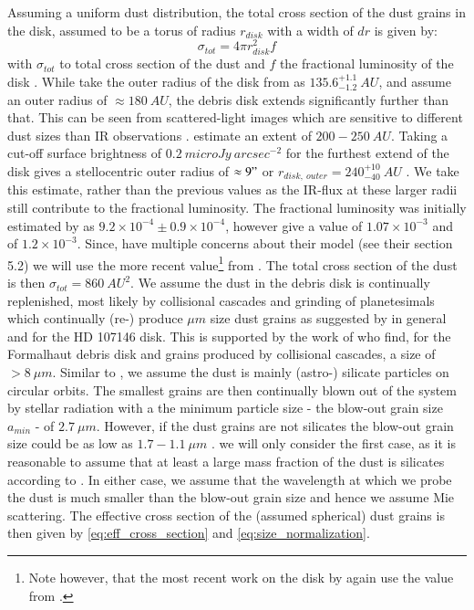 \documentclass{aa}
\begin{document}
Assuming a uniform dust distribution, the total cross section of the dust grains in the disk, assumed to be a torus of radius $r_{disk}$ with a width of $dr$ is given by:
\begin{equation}
    \sigma_{tot} = 4 \pi r_{disk}^2 f
\end{equation}
with $\sigma_{tot}$ to total cross section of the dust and $f$ the fractional luminosity of the disk \citep{wyatt2008evolution}.
While \cite{marino2018gap} take the outer radius of the disk from as $135.6^{+1.1}_{-1.2} ~ AU$, and \cite{vanSluijs2018feasibility} assume an outer radius of $\approx 180 ~ AU$, the debris disk extends significantly further than that. This can be seen from scattered-light images which are sensitive to different dust sizes than IR observations \citep{ertel2011multi}. \cite{vanSluijs2018feasibility} estimate an extent of $200-250~ AU$. Taking a cut-off surface brightness of $0.2 ~microJy~arcsec^{-2}$ for the furthest extend of the disk gives a stellocentric outer radius of $\approx 9"$ or $r_{disk,~outer} = 240^{+10}_{-40}~AU$ \citep{schneider2014probing}. We take this estimate, rather than the previous values as the IR-flux at these larger radii still contribute to the fractional luminosity. The fractional luminosity was initially estimated by \cite{moor2006nearby} as $9.2\times10^{-4} \pm 0.9\times10^{-4}$, however \cite{ertel2011multi} give a value of $1.07\times10^{-3}$ and \cite{schneider2014probing} of $1.2\times10^{-3}$. Since, \cite{ertel2011multi} have multiple concerns about their model (see their section 5.2) we will use the more recent value\footnote{Note however, that the most recent work on the disk by \cite{mesa2021limits} again use the value from \cite{ertel2011multi}.} from \cite{schneider2014probing}.
The total cross section of the dust is then $\sigma_{tot} = 860 ~ AU^2$.
We assume the dust in the debris disk is continually replenished, most likely by collisional cascades and grinding of planetesimals which continually (re-) produce $\mu m$ size dust grains as suggested by \cite{kenyon2005prospects} in general and \cite{ricci2015alma} for the HD 107146 disk. This is supported by the work of \cite{chiang2009fomalhaut} who find, for the Formalhaut debris disk and grains produced by collisional cascades, a size of $> 8~ \mu m$.
Similar to \cite{vanSluijs2018feasibility}, we assume the dust is mainly (astro-) silicate particles on circular orbits. The smallest grains are then continually blown out of the system by stellar radiation with a the minimum particle size - the blow-out grain size $a_{min}$ - of $2.7~\mu m$. However, if the dust grains are not silicates the blow-out grain size could be as low as $1.7-1.1~\mu m$ \citep{ricci2015alma, marino2018gap}. we will only consider the first case, as it is reasonable to assume that at least a large mass fraction of the dust is silicates according to \cite{marino2018gap}. In either case, we assume that the wavelength at which we probe the dust is much smaller than the blow-out grain size and hence we assume Mie scattering. The effective cross section of the (assumed spherical) dust grains is then given by \autoref{eq:eff_cross_section} and \autoref{eq:size_normalization}.
\end{document}
